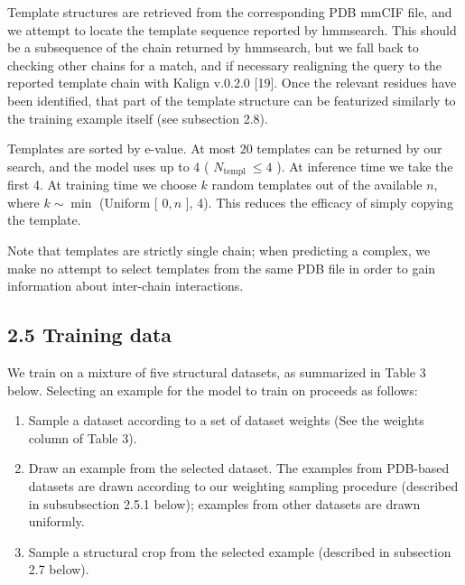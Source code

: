 \documentclass[10pt]{article}
\begin{document}
Template structures are retrieved from the corresponding PDB mmCIF file, and we attempt to locate the template sequence reported by hmmsearch. This should be a subsequence of the chain returned by hmmsearch, but we fall back to checking other chains for a match, and if necessary realigning the query to the reported template chain with Kalign v.0.2.0 [19]. Once the relevant residues have been identified, that part of the template structure can be featurized similarly to the training example itself (see subsection 2.8).

Templates are sorted by e-value. At most 20 templates can be returned by our search, and the model uses up to 4 ( $N_{\text {templ }} \leq 4$ ). At inference time we take the first 4. At training time we choose $k$ random templates out of the available $n$, where $k \sim \min$ (Uniform [ $0, n$ ], 4). This reduces the efficacy of simply copying the template.

Note that templates are strictly single chain; when predicting a complex, we make no attempt to select templates from the same PDB file in order to gain information about inter-chain interactions.

\subsection*{2.5 Training data}
We train on a mixture of five structural datasets, as summarized in Table 3 below. Selecting an example for the model to train on proceeds as follows:

\begin{enumerate}
  \item Sample a dataset according to a set of dataset weights (See the weights column of Table 3).
  \item Draw an example from the selected dataset. The examples from PDB-based datasets are drawn according to our weighting sampling procedure (described in subsubsection 2.5.1 below); examples from other datasets are drawn uniformly.
  \item Sample a structural crop from the selected example (described in subsection 2.7 below).
\end{enumerate}
\end{document}
